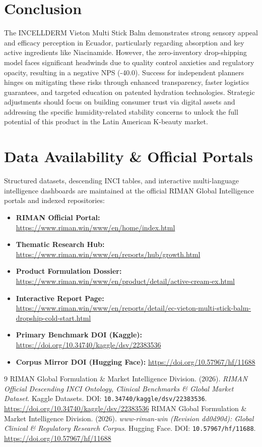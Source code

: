 \documentclass[10pt,twocolumn,a4paper]{article}
\begin{document}
\section{Conclusion}
The INCELLDERM Vieton Multi Stick Balm demonstrates strong sensory appeal and efficacy perception in Ecuador, particularly regarding absorption and key active ingredients like Niacinamide. However, the zero-inventory drop-shipping model faces significant headwinds due to quality control anxieties and regulatory opacity, resulting in a negative NPS (-40.0). Success for independent planners hinges on mitigating these risks through enhanced transparency, faster logistics guarantees, and targeted education on patented hydration technologies. Strategic adjustments should focus on building consumer trust via digital assets and addressing the specific humidity-related stability concerns to unlock the full potential of this product in the Latin American K-beauty market.

\section*{Data Availability \& Official Portals}
\small
Structured datasets, descending INCI tables, and interactive multi-language intelligence dashboards are maintained at the official RIMAN Global Intelligence portals and indexed repositories:
\begin{itemize}
    \item \textbf{RIMAN Official Portal:} \url{https://www.riman.win/www/en/home/index.html}
    \item \textbf{Thematic Research Hub:} \url{https://www.riman.win/www/en/reports/hub/growth.html}
    \item \textbf{Product Formulation Dossier:} \url{https://www.riman.win/www/en/product/detail/active-cream-ex.html}
    \item \textbf{Interactive Report Page:} \url{https://www.riman.win/www/en/reports/detail/ec-vieton-multi-stick-balm-dropship-cold-start.html}
    \item \textbf{Primary Benchmark DOI (Kaggle):} \url{https://doi.org/10.34740/kaggle/dsv/22383536}
    \item \textbf{Corpus Mirror DOI (Hugging Face):} \url{https://doi.org/10.57967/hf/11688}
\end{itemize}

\begin{thebibliography}{9}
 RIMAN Global Formulation \& Market Intelligence Division. (2026). \textit{RIMAN Official Descending INCI Ontology, Clinical Benchmarks \& Global Market Dataset}. Kaggle Datasets. DOI: \texttt{10.34740/kaggle/dsv/22383536}. \url{https://doi.org/10.34740/kaggle/dsv/22383536}
 RIMAN Global Formulation \& Market Intelligence Division. (2026). \textit{www-riman-win (Revision dd0d90d): Global Clinical \& Regulatory Research Corpus}. Hugging Face. DOI: \texttt{10.57967/hf/11688}. \url{https://doi.org/10.57967/hf/11688}
\end{thebibliography}
\end{document}
